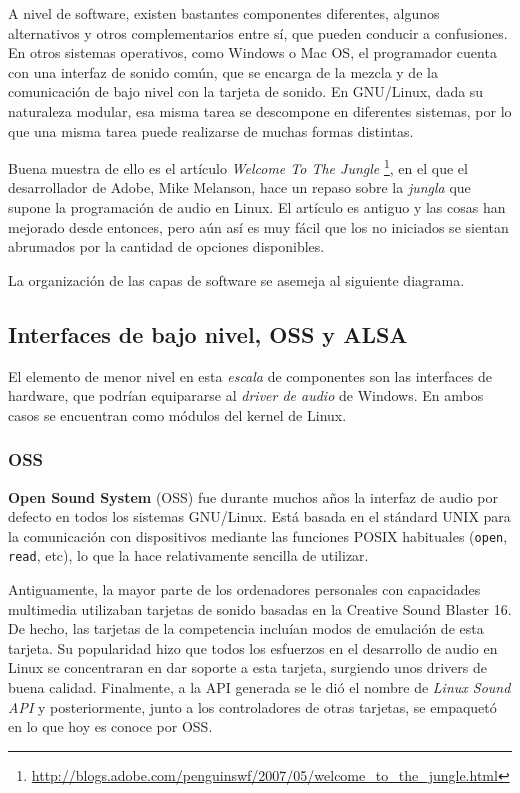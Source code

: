 A nivel de software, existen bastantes componentes diferentes, algunos
alternativos y otros complementarios entre sí, que pueden conducir a
confusiones. En otros sistemas operativos, como Windows o Mac OS, el programador
cuenta con una interfaz de sonido común, que se encarga de la mezcla y de la
comunicación de bajo nivel con la tarjeta de sonido. En GNU/Linux, dada su
naturaleza modular, esa misma tarea se descompone en diferentes sistemas, por lo
que una misma tarea puede realizarse de muchas formas distintas.

Buena muestra de ello es el artículo \textit{Welcome To The Jungle}
\footnote{\url{http://blogs.adobe.com/penguinswf/2007/05/welcome_to_the_jungle.html}},
en el que el desarrollador de Adobe, Mike Melanson, hace un repaso sobre la
\textit{jungla} que supone la programación de audio en Linux. El artículo es
antiguo y las cosas han mejorado desde entonces, pero aún así es muy fácil que
los no iniciados se sientan abrumados por la cantidad de opciones disponibles.

La organización de las capas de software se asemeja al siguiente diagrama.


\subsection{Interfaces de bajo nivel, OSS y ALSA}
El elemento de menor nivel en esta \textit{escala} de componentes son las
interfaces de hardware, que podrían equipararse al \textit{driver de audio} de
Windows. En ambos casos se encuentran como módulos del kernel de Linux.

\subsubsection{OSS}
\textbf{Open Sound System} (OSS) fue durante muchos años la interfaz de audio
por defecto en todos los sistemas GNU/Linux. Está basada en el stándard UNIX
para la comunicación con dispositivos mediante las funciones POSIX habituales
(\texttt{open}, \texttt{read}, etc), lo que la hace relativamente sencilla de
utilizar.

Antiguamente, la mayor parte de los ordenadores personales con capacidades
multimedia utilizaban tarjetas de sonido basadas en la Creative Sound Blaster
16. De hecho, las tarjetas de la competencia incluían modos de emulación de esta
tarjeta. Su popularidad hizo que todos los esfuerzos en el desarrollo de audio
en Linux se concentraran en dar soporte a esta tarjeta, surgiendo unos drivers
de buena calidad. Finalmente, a la API generada se le dió el nombre de
\textit{Linux Sound API} y posteriormente, junto a los controladores de otras
tarjetas, se empaquetó en lo que hoy es conoce por OSS.

